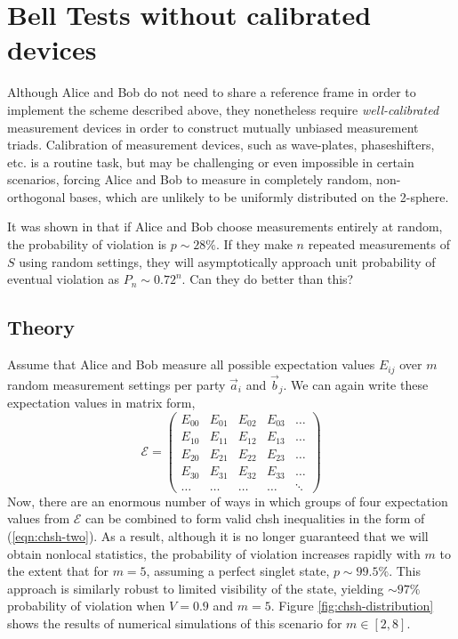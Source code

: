 \section{Bell Tests without calibrated devices} 
\label{sec:random-chsh-no-calibration}

Although Alice and Bob do not need to share a reference frame in order to implement the scheme described above, they nonetheless require \emph{well-calibrated} measurement devices in order to construct mutually unbiased measurement triads. Calibration of measurement devices, such as wave-plates, phaseshifters, etc. is a routine task, but may be challenging or even impossible in certain scenarios, forcing Alice and Bob to measure in completely random, non-orthogonal bases, which are unlikely to be uniformly distributed on the 2-sphere.  

It was shown in \cite{Liang2010} that if Alice and Bob choose measurements entirely at random, the probability of violation is $p \sim 28\%$. If they make $n$ repeated measurements of $S$ using random settings, they will asymptotically approach unit probability of eventual violation as $P_n \sim 0.72^n$. Can they do better than this?

\subsection{Theory} 
Assume that Alice and Bob measure all possible expectation values $E_{ij}$ over $m$ random measurement settings per party
$\vec{a}_i$ and $\vec{b}_j$. We can again write these expectation values in matrix form,
\begin{equation}
\mathcal{E}=
\left(
\begin{array}{ccccc}
E_{00} & E_{01} & E_{02} & E_{03} & \ldots\\
E_{10} & E_{11} & E_{12} & E_{13} & \ldots\\
E_{20} & E_{21} & E_{22} & E_{23} & \ldots\\
E_{30} & E_{31} & E_{32} & E_{33} & \ldots\\
\ldots & \ldots & \ldots & \ldots & \ddots 
\end{array}
\right)
\end{equation}
Now, there are an enormous number of ways in which groups of four expectation values from $\mathcal{E}$ can be combined to form valid \gls{chsh} inequalities in the form of (\ref{eqn:chsh-two}).
As a result, although it is no longer guaranteed that we will obtain nonlocal statistics, the probability of violation increases rapidly with $m$ to the extent that for $m=5$, assuming a perfect singlet state, $p\sim99.5\%$. This approach is similarly robust to limited visibility of the state, yielding $\sim97\%$ probability of violation when $V=0.9$ and $m=5$. Figure \ref{fig:chsh-distribution} shows the results of numerical simulations of this scenario for $m\in\left[2, 8\right]$.

